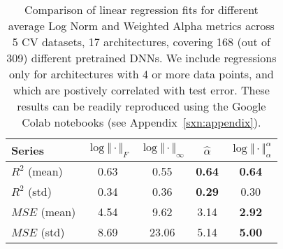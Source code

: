 \begin{table}[t]
\small
\begin{center}
\begin{tabular}{|p{0.75in}|c|c|c|c|}
\hline
Series        & $\log\Vert\cdot\Vert_{F}$ & $\log\Vert\cdot\Vert_{\infty}$ & $\hat{\alpha}$ & $\log\Vert\cdot\Vert^{\alpha}_{\alpha}$ \\
\hline
$R^{2}$ (mean) & 0.63 &  0.55 & \textbf{0.64} & \textbf{0.64} \\
$R^{2}$ (std)  & 0.34 &  0.36 & \textbf{0.29} &          0.30 \\
\hline
$MSE$ (mean)   & 4.54 &  9.62 &          3.14 & \textbf{2.92} \\
$MSE$ (std)    & 8.69 & 23.06 &          5.14 & \textbf{5.00} \\
\hline
\end{tabular}
\end{center}
\caption{Comparison of linear regression fits for different average Log Norm and Weighted Alpha metrics across 5 CV datasets, 17 architectures, covering 168 (out of 309) different pretrained DNNs.  
         We include regressions only for architectures with 4 or more data points, and which are postively correlated with test error.
         These results can be readily reproduced using the Google Colab notebooks (see Appendix~\ref{sxn:appendix}). 
        }
\label{table:results}
\end{table}



